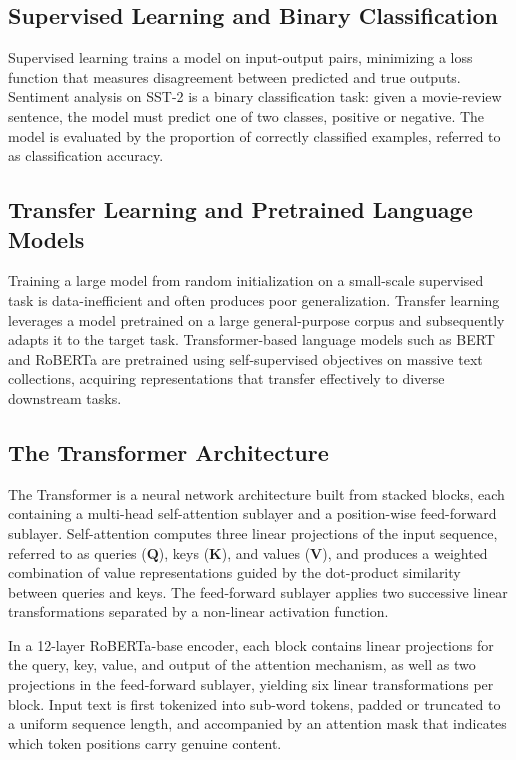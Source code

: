 \documentclass[conference]{IEEEtran}
\begin{document}
\subsection{Supervised Learning and Binary Classification}
Supervised learning trains a model on input-output pairs,
minimizing a loss function that measures disagreement between
predicted and true outputs. Sentiment analysis on SST-2 is a
binary classification task: given a movie-review sentence, the
model must predict one of two classes, positive or negative.
The model is evaluated by the proportion of correctly
classified examples, referred to as classification accuracy.

\subsection{Transfer Learning and Pretrained Language Models}
Training a large model from random initialization on a
small-scale supervised task is data-inefficient and often
produces poor generalization. Transfer learning leverages a
model pretrained on a large general-purpose corpus and
subsequently adapts it to the target task. Transformer-based
language models such as BERT \cite{devlin2019bert} and
RoBERTa \cite{liu2019roberta} are pretrained using
self-supervised objectives on massive text collections,
acquiring representations that transfer effectively to diverse
downstream tasks.

\subsection{The Transformer Architecture}
The Transformer \cite{vaswani2017attention} is a neural
network architecture built from stacked blocks, each
containing a multi-head self-attention sublayer and a
position-wise feed-forward sublayer. Self-attention computes
three linear projections of the input sequence, referred to as
queries ($\mathbf{Q}$), keys ($\mathbf{K}$), and values
($\mathbf{V}$), and produces a weighted combination of value
representations guided by the dot-product similarity between
queries and keys. The feed-forward sublayer applies two
successive linear transformations separated by a non-linear
activation function.

In a 12-layer RoBERTa-base encoder, each block contains
linear projections for the query, key, value, and output of
the attention mechanism, as well as two projections in the
feed-forward sublayer, yielding six linear transformations per
block. Input text is first tokenized into sub-word tokens,
padded or truncated to a uniform sequence length, and
accompanied by an attention mask that indicates which token
positions carry genuine content.
\end{document}
